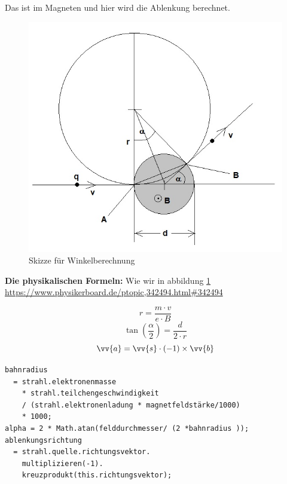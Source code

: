 Das ist im Magneten und hier wird die Ablenkung berechnet.
\begin{figure}
    \centering
    \includegraphics[width=.75\textwidth]{fig/elektronenstrahl-ablenkung_101.jpg}
    \caption{Skizze für Winkelberechnung}
    \label{fig:ausBlock}
\end{figure}

\newline \textbf{Die physikalischen Formeln:}
\newline Wie wir in abbildung \ref{fig:ausBlock}
\newline \url{https://www.physikerboard.de/ptopic,342494.html#342494}

$$ r = \frac{m \cdot v}{e \cdot B}$$
$$ \tan(\frac{\alpha}{2}) = \frac{d}{2 \cdot r}$$
$$ \vv{a} = \vv{s} \cdot (-1) \times \vv{b}$$
\begin{lstlisting}
bahnradius 
  = strahl.elektronenmasse 
    * strahl.teilchengeschwindigkeit 
    / (strahl.elektronenladung * magnetfeldstärke/1000)
    * 1000;
alpha = 2 * Math.atan(felddurchmesser/ (2 *bahnradius ));
ablenkungsrichtung
  = strahl.quelle.richtungsvektor.
    multiplizieren(-1).
    kreuzprodukt(this.richtungsvektor);
\end{lstlisting}

